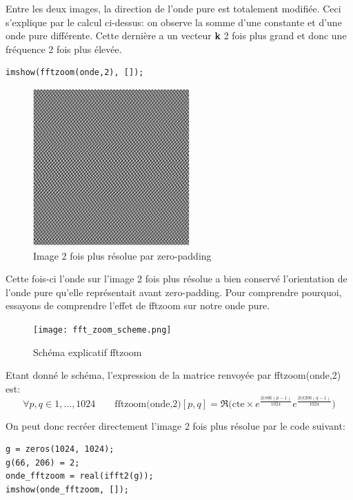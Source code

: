 \documentclass[a4paper, 11pt]{article}
\begin{document}
Entre les deux images, la direction de l'onde pure est totalement modifiée. Ceci s'explique par le calcul ci-dessus: on observe la somme d'une constante et d'une onde pure différente. Cette dernière a un vecteur \textbf{k} 2 fois plus grand et donc une fréquence 2 fois plus élevée.

\begin{lstlisting}[frame=single]
imshow(fftzoom(onde,2), []);
\end{lstlisting}

\begin{figure}[!h]
\centering
\includegraphics[width=6cm]{ex_5_fftzoom.png}
\caption{Image 2 fois plus résolue par zero-padding}
\end{figure}

Cette fois-ci l'onde sur l'image 2 fois plus résolue a bien conservé l'orientation de l'onde pure qu'elle représentait
avant zero-padding. Pour comprendre pourquoi, essayons de comprendre l'effet de fftzoom sur notre onde pure.

\begin{figure}[!h]
\centering
\texttt{[image: fft\_zoom\_scheme.png]}
\caption{Schéma explicatif fftzoom}
\end{figure}

\pagebreak

Etant donné le schéma, l'expression de la matrice renvoyée par fftzoom(onde,2) est:
\begin{equation}
\forall p, q \in 1,\dots,1024 \qquad \text{fftzoom(onde,2)}[p,q] = \Re{\Big(\text{cte} \times 
e^{\frac{2i\pi66(p-1)}{1024}} e^{\frac{2i\pi206(q-1)}{1024}}\Big)}
\end{equation}

On peut donc recréer directement l'image 2 fois plus résolue par le code suivant:

\begin{lstlisting}[frame=single]
g = zeros(1024, 1024);
g(66, 206) = 2;
onde_fftzoom = real(ifft2(g));
imshow(onde_fftzoom, []);
\end{lstlisting}
\end{document}
